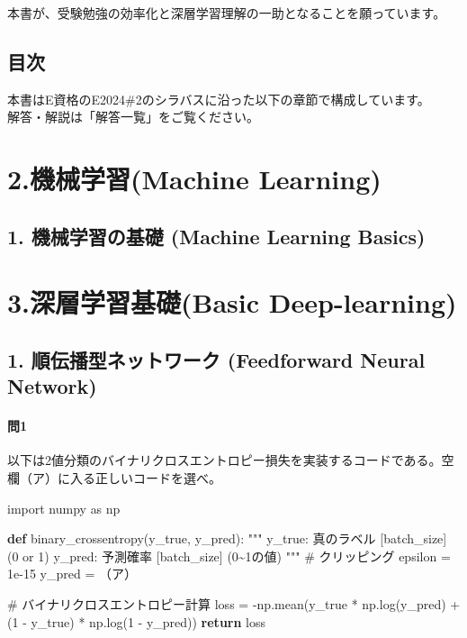 \documentclass[
  letterpaper,
  DIV=11,
  numbers=noendperiod]{scrreprt}
\newenvironment{Shaded}{\begin{snugshade}}{\end{snugshade}}
\newcommand{\CommentTok}[1]{\textcolor[rgb]{0.37,0.37,0.37}{#1}}
\newcommand{\ControlFlowTok}[1]{\textcolor[rgb]{0.00,0.23,0.31}{\textbf{#1}}}
\newcommand{\DecValTok}[1]{\textcolor[rgb]{0.68,0.00,0.00}{#1}}
\newcommand{\FloatTok}[1]{\textcolor[rgb]{0.68,0.00,0.00}{#1}}
\newcommand{\ImportTok}[1]{\textcolor[rgb]{0.00,0.46,0.62}{#1}}
\newcommand{\KeywordTok}[1]{\textcolor[rgb]{0.00,0.23,0.31}{\textbf{#1}}}
\newcommand{\NormalTok}[1]{\textcolor[rgb]{0.00,0.23,0.31}{#1}}
\newcommand{\OperatorTok}[1]{\textcolor[rgb]{0.37,0.37,0.37}{#1}}
\begin{document}
本書が、受験勉強の効率化と深層学習理解の一助となることを願っています。


\chapter{目次}\label{ux76eeux6b21}

本書はE資格のE2024\#2のシラバスに沿った以下の章節で構成しています。\\
解答・解説は「解答一覧」をご覧ください。

\part{2.機械学習(Machine Learning)}

\chapter{1. 機械学習の基礎 (Machine Learning
Basics)}\label{ux6a5fux68b0ux5b66ux7fd2ux306eux57faux790e-machine-learning-basics}

\part{3.深層学習基礎(Basic Deep-learning)}

\chapter{1. 順伝播型ネットワーク (Feedforward Neural
Network)}\label{ux9806ux4f1dux64adux578bux30cdux30c3ux30c8ux30efux30fcux30af-feedforward-neural-network}

\subsection{問1}\label{ux554f1}

以下は2値分類のバイナリクロスエントロピー損失を実装するコードである。空欄（ア）に入る正しいコードを選べ。

\begin{Shaded}
\begin{Highlighting}[]
\ImportTok{import}\NormalTok{ numpy }\ImportTok{as}\NormalTok{ np}

\KeywordTok{def}\NormalTok{ binary\_crossentropy(y\_true, y\_pred):}
    \CommentTok{"""}
\CommentTok{    y\_true: 真のラベル [batch\_size] (0 or 1)}
\CommentTok{    y\_pred: 予測確率 [batch\_size] (0\textasciitilde{}1の値)}
\CommentTok{    """}
    \CommentTok{\# クリッピング}
\NormalTok{    epsilon }\OperatorTok{=} \FloatTok{1e{-}15}
\NormalTok{    y\_pred }\OperatorTok{=}\NormalTok{ （ア）}
    
    \CommentTok{\# バイナリクロスエントロピー計算}
\NormalTok{    loss }\OperatorTok{=} \OperatorTok{{-}}\NormalTok{np.mean(y\_true }\OperatorTok{*}\NormalTok{ np.log(y\_pred) }\OperatorTok{+}\NormalTok{ (}\DecValTok{1} \OperatorTok{{-}}\NormalTok{ y\_true) }\OperatorTok{*}\NormalTok{ np.log(}\DecValTok{1} \OperatorTok{{-}}\NormalTok{ y\_pred))}
    \ControlFlowTok{return}\NormalTok{ loss}
\end{Highlighting}
\end{Shaded}
\end{document}
